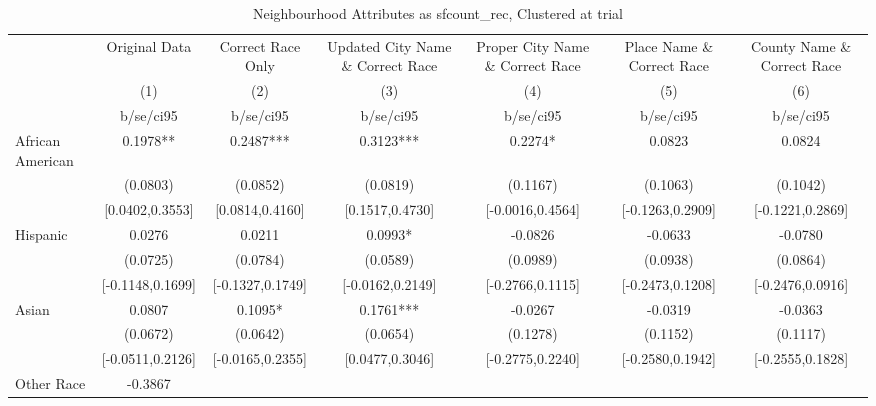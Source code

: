 \documentclass{article}
\begin{document}
\begin{table}[htbp]\centering
\def\sym#1{\ifmmode^{#1}\else\(^{#1}\)\fi}
\caption{Neighbourhood Attributes as sfcount\_rec, Clustered at trial}
\begin{tabular}{l*{6}{c}}
\toprule
                    &\multicolumn{1}{c}{Original Data}&\multicolumn{1}{c}{Correct Race Only}&\multicolumn{1}{c}{Updated City Name \& Correct Race}&\multicolumn{1}{c}{Proper City Name \& Correct Race}&\multicolumn{1}{c}{Place Name \& Correct Race}&\multicolumn{1}{c}{County Name \& Correct Race}\\\cmidrule(lr){2-2}\cmidrule(lr){3-3}\cmidrule(lr){4-4}\cmidrule(lr){5-5}\cmidrule(lr){6-6}\cmidrule(lr){7-7}
                    &\multicolumn{1}{c}{(1)}   &\multicolumn{1}{c}{(2)}   &\multicolumn{1}{c}{(3)}   &\multicolumn{1}{c}{(4)}   &\multicolumn{1}{c}{(5)}   &\multicolumn{1}{c}{(6)}   \\
                    &   b/se/ci95   &   b/se/ci95   &   b/se/ci95   &   b/se/ci95   &   b/se/ci95   &   b/se/ci95   \\
\midrule
African American    &      0.1978** &      0.2487***&      0.3123***&      0.2274*  &      0.0823   &      0.0824   \\
                    &    (0.0803)   &    (0.0852)   &    (0.0819)   &    (0.1167)   &    (0.1063)   &    (0.1042)   \\
                    &[0.0402,0.3553]   &[0.0814,0.4160]   &[0.1517,0.4730]   &[-0.0016,0.4564]   &[-0.1263,0.2909]   &[-0.1221,0.2869]   \\
Hispanic            &      0.0276   &      0.0211   &      0.0993*  &     -0.0826   &     -0.0633   &     -0.0780   \\
                    &    (0.0725)   &    (0.0784)   &    (0.0589)   &    (0.0989)   &    (0.0938)   &    (0.0864)   \\
                    &[-0.1148,0.1699]   &[-0.1327,0.1749]   &[-0.0162,0.2149]   &[-0.2766,0.1115]   &[-0.2473,0.1208]   &[-0.2476,0.0916]   \\
Asian               &      0.0807   &      0.1095*  &      0.1761***&     -0.0267   &     -0.0319   &     -0.0363   \\
                    &    (0.0672)   &    (0.0642)   &    (0.0654)   &    (0.1278)   &    (0.1152)   &    (0.1117)   \\
                    &[-0.0511,0.2126]   &[-0.0165,0.2355]   &[0.0477,0.3046]   &[-0.2775,0.2240]   &[-0.2580,0.1942]   &[-0.2555,0.1828]   \\
Other Race          &     -0.3867   &               &               &               &               &               \\

\end{tabular}
\end{table}
\end{document}
